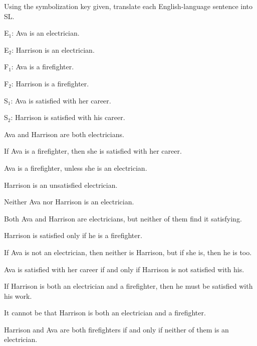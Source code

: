 


\noindent\problempart Using the symbolization key given, translate each English-language sentence into SL.
\label{pr.avacareer}
\begin{ekey}
\item[E$_1$:] Ava is an electrician.
\item[E$_2$:] Harrison is an electrician.
\item[F$_1$:] Ava is a firefighter.
\item[F$_2$:] Harrison is a firefighter.
\item[S$_1$:] Ava is satisfied with her career.
\item[S$_2$:] Harrison is satisfied with his career.
\end{ekey}
\begin{exercises}
\item Ava and Harrison are both electricians. 
\item If Ava is a firefighter, then she is satisfied with her career. 
\item Ava is a firefighter, unless she is an electrician. 
\item Harrison is an unsatisfied electrician. 
\item Neither Ava nor Harrison is an electrician. 
\item Both Ava and Harrison are electricians, but neither of them find it satisfying. 
\item Harrison is satisfied only if he is a firefighter. 
\item If Ava is not an electrician, then neither is Harrison, but if she is, then he is too. 
\item Ava is satisfied with her career if and only if Harrison is not satisfied with his. 
\item If Harrison is both an electrician and a firefighter, then he must be satisfied with his work. 
\item It cannot be that Harrison is both an electrician and a firefighter. 
\item Harrison and Ava are both firefighters if and only if neither of them is an electrician.  \vspace{1ex}
\end{exercises}

